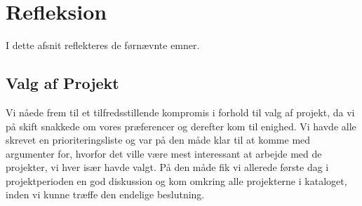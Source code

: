 %
%

\section{Refleksion}
I dette afsnit reflekteres de førnævnte emner.

\subsection{Valg af Projekt}
Vi nåede frem til et tilfredsstillende kompromis i forhold til valg af projekt, da vi på skift snakkede om vores præferencer og derefter kom til enighed. Vi havde alle skrevet en prioriteringsliste og var på den måde klar til at komme med argumenter for, hvorfor det ville være mest interessant at arbejde med de projekter, vi hver især havde valgt. På den måde fik vi allerede første dag i projektperioden en god diskussion og kom omkring alle projekterne i kataloget, inden vi kunne træffe den endelige beslutning. 

